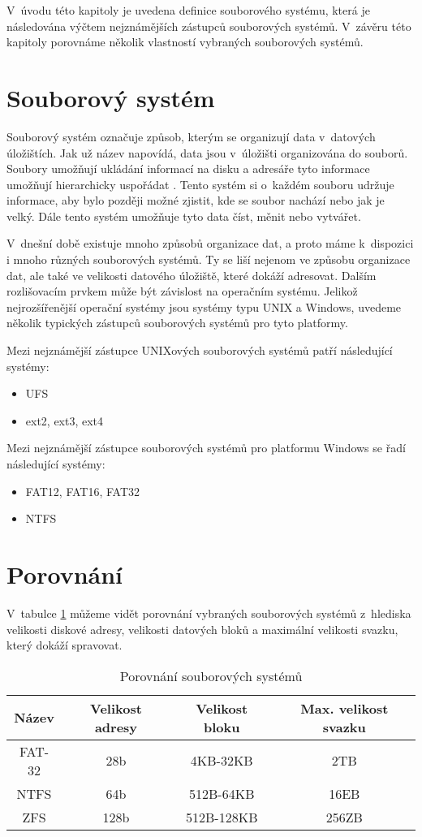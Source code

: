 V~úvodu této kapitoly je uvedena definice souborového systému, která je následována výčtem nejznámějších zástupců souborových systémů. V~závěru této kapitoly porovnáme několik vlastností vybraných souborových systémů.
\section{Souborový systém}
    \label{fs}
    Souborový systém označuje způsob, kterým se organizují data v~datových úložištích. Jak už název napovídá, data jsou v~úložišti organizována do souborů. Soubory umožňují ukládání informací na disku a adresáře tyto informace umožňují hierarchicky uspořádat \cite{fs}. Tento systém si o~každém souboru udržuje informace, aby bylo později možné zjistit, kde se soubor nachází nebo jak je velký. Dále tento systém umožňuje tyto data číst, měnit nebo vytvářet.

    V~dnešní době existuje mnoho způsobů organizace dat, a proto máme k~dispozici i mnoho různých souborových systémů. Ty se liší nejenom ve způsobu organizace dat,
    ale také ve velikosti datového úložiště, které dokáží adresovat. Dalším rozlišovacím prvkem může být závislost na operačním systému.
    Jelikož nejrozšířenější operační systémy jsou systémy typu UNIX a Windows, uvedeme několik typických zástupců souborových systémů pro tyto platformy.

    Mezi nejznámější zástupce UNIXových souborových systémů patří následující systémy:
    \begin{itemize}
      \item UFS
      \item ext2, ext3, ext4
    \end{itemize}

    Mezi nejznámější zástupce souborových systémů pro platformu Windows se řadí následující systémy:
    \begin{itemize}
      \item FAT12, FAT16, FAT32
      \item NTFS
    \end{itemize}

\section{Porovnání}
    V~tabulce \ref{fscompare} můžeme vidět porovnání vybraných souborových systémů z~hlediska velikosti diskové adresy, velikosti datových bloků a maximální velikosti svazku, který dokáží spravovat.
    \begin{table}
    \centering
    \caption{Porovnání souborových systémů \cite{fs}}
    \label{fscompare}
    \begin{tabular}{|c|c|c|c|}
    \hline
    Název & Velikost adresy & Velikost bloku & Max. velikost svazku \\ \hline
    FAT-32 & 28b & 4KB-32KB & 2TB \\ \hline
    NTFS & 64b & 512B-64KB & 16EB \\ \hline
    ZFS & 128b & 512B-128KB & 256ZB \\ \hline
    \end{tabular}
    \end{table} 